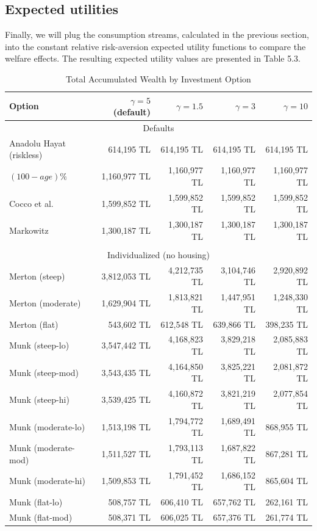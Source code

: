 \subsection{Expected utilities}
Finally, we will plug the consumption streams, calculated in the previous section, into the constant relative risk-aversion expected utility functions to compare the welfare effects. The resulting expected utility values are presented in Table 5.3.


\begin{table}%
	\centering
	\caption{Total Accumulated Wealth by Investment Option}
	\begin{tabular}[c]{lrrrr}
		\hline
		Option&$\gamma=5$ (default) & $\gamma=1.5$ & $\gamma=3$ & $\gamma=10$\\
		\hline
		\multicolumn{5}{c}{Defaults}\\
Anadolu Hayat (riskless)&614,195 TL&614,195 TL&614,195 TL&614,195 TL\\
$(100-age)\%$&1,160,977 TL&1,160,977 TL&1,160,977 TL&1,160,977 TL\\
Cocco et al.&1,599,852 TL&1,599,852 TL&1,599,852 TL&1,599,852 TL\\
Markowitz&1,300,187 TL&1,300,187 TL&1,300,187 TL&1,300,187 TL\\
\multicolumn{5}{c}{}\\
\multicolumn{5}{c}{Individualized (no housing)}\\
Merton (steep)&3,812,053 TL&4,212,735 TL&3,104,746 TL&2,920,892 TL\\
Merton (moderate)&1,629,904 TL&1,813,821 TL&1,447,951 TL&1,248,330 TL\\
Merton (flat)&543,602 TL&612,548 TL&639,866 TL&398,235 TL\\
Munk (steep-lo)&3,547,442 TL&4,168,823 TL&3,829,218 TL&2,085,883 TL\\
Munk (steep-mod)&3,543,435 TL&4,164,850 TL&3,825,221 TL&2,081,872 TL\\
Munk (steep-hi)&3,539,425 TL&4,160,872 TL&3,821,219 TL&2,077,854 TL\\
Munk (moderate-lo)&1,513,198 TL&1,794,772 TL&1,689,491 TL&868,955 TL\\
Munk (moderate-mod)&1,511,527 TL&1,793,113 TL&1,687,822 TL&867,281 TL\\
Munk (moderate-hi)&1,509,853 TL&1,791,452 TL&1,686,152 TL&865,604 TL\\
Munk (flat-lo)&508,757 TL&606,410 TL&657,762 TL&262,161 TL\\
Munk (flat-mod)&508,371 TL&606,025 TL&657,376 TL&261,774 TL\\

\end{tabular}
\end{table}
